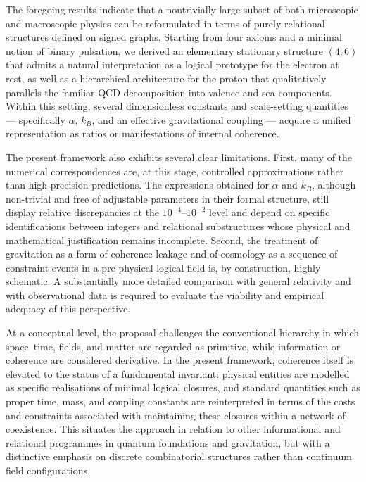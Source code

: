 \documentclass[11pt,a4paper]{article}
\begin{document}
The foregoing results indicate that a nontrivially large subset of both microscopic and macroscopic physics can be reformulated in terms of purely relational structures defined on signed graphs. Starting from four axioms and a minimal notion of binary pulsation, we derived an elementary stationary structure \((4,6)\) that admits a natural interpretation as a logical prototype for the electron at rest, as well as a hierarchical architecture for the proton that qualitatively parallels the familiar QCD decomposition into valence and sea components. Within this setting, several dimensionless constants and scale-setting quantities — specifically \(\alpha\), \(k_B\), and an effective gravitational coupling — acquire a unified representation as ratios or manifestations of internal coherence.

The present framework also exhibits several clear limitations. First, many of the numerical correspondences are, at this stage, controlled approximations rather than high-precision predictions. The expressions obtained for \(\alpha\) and \(k_B\), although non-trivial and free of adjustable parameters in their formal structure, still display relative discrepancies at the \(10^{-4}\)–\(10^{-2}\) level and depend on specific identifications between integers and relational substructures whose physical and mathematical justification remains incomplete. Second, the treatment of gravitation as a form of coherence leakage and of cosmology as a sequence of constraint events in a pre-physical logical field is, by construction, highly schematic. A substantially more detailed comparison with general relativity and with observational data is required to evaluate the viability and empirical adequacy of this perspective.

At a conceptual level, the proposal challenges the conventional hierarchy in which space–time, fields, and matter are regarded as primitive, while information or coherence are considered derivative. In the present framework, coherence itself is elevated to the status of a fundamental invariant: physical entities are modelled as specific realisations of minimal logical closures, and standard quantities such as proper time, mass, and coupling constants are reinterpreted in terms of the costs and constraints associated with maintaining these closures within a network of coexistence. This situates the approach in relation to other informational and relational programmes in quantum foundations and gravitation, but with a distinctive emphasis on discrete combinatorial structures rather than continuum field configurations.
\end{document}
